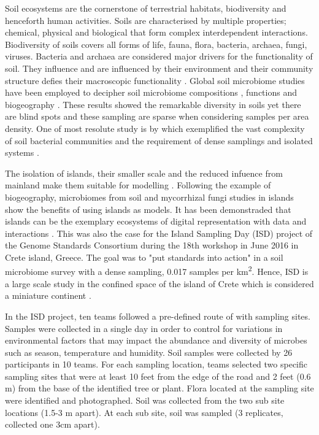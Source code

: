Soil ecosystems are the cornerstone of terrestrial habitats, biodiversity and henceforth human activities.
Soils are characterised by multiple properties; chemical, physical and biological that 
form complex interdependent interactions. Biodiversity of soils covers
all forms of life, fauna, flora, bacteria, archaea, fungi, viruses. 
Bacteria and archaea are considered major drivers for the functionality of soil.
They influence and are influenced by their environment and their community structure 
defies their macroscopic functionality \parencite{Bahram2018}.
Global soil microbiome studies have been employed to decipher soil microbiome
compositions \parencite{thompson2017a-communal, Delgado-Baquerizo-atlas, Labouyrie2023},
functions \parencite{Bahram2018} and biogeography \parencite{Martiny2006, guerra2020Blind}.
These results showed the remarkable diversity in soils yet there are blind spots \parencite{guerra2020Blind}
and these sampling are sparse when considering samples per area density. One of most resolute
study is by \parencite{Karimi2020} which exemplified the 
vast complexity of soil bacterial communities and the requirement of
dense samplings and isolated systems \parencite{Dini-Andreote2021}.

The isolation of islands, their smaller scale and the reduced infuence from mainland
make them suitable for modelling \parencite{Whittaker2017}. 
Following the example of biogeography, microbiomes from soil \parencite{Li2020} and mycorrhizal fungi \parencite{Delavaux2021} studies
in islands show the benefits of using islands as models. It has been demonstraded 
that islands can be the exemplary ecosystems of digital representation with data and interactions \parencite{Davies2016}.
This was also the case for the Island Sampling Day (ISD) project \parencite{holm2024}
of the Genome Standards Consortium \parencite{Field2011}
during the 18th workshop in June 2016 in Crete island, Greece. The goal was to "put standards into action"
in a soil microbiome survey with a dense sampling, 0.017 samples per km\textsuperscript{2}.
Hence, ISD is a large scale study in the confined space of the island of Crete which 
is considered a miniature continent \parencite{Vogiatzakis2008_crete}.

In the ISD project, ten teams followed a pre-defined route of with sampling sites.
Samples were collected in a single day in order to control for variations in environmental
factors that may impact the abundance and diversity of microbes such as season,
temperature and humidity. Soil samples were collected by 26 participants in 10 teams.
For each sampling location, teams selected two specific sampling sites that were
at least 10 feet from the edge of the road and 2 feet (0.6 m) from the base of
the identified tree or plant. Flora located at the sampling site were
identified and photographed.
Soil was collected from the two sub site locations (1.5-3 m apart).
At each sub site, soil was sampled (3 replicates, collected one 3cm apart). 

